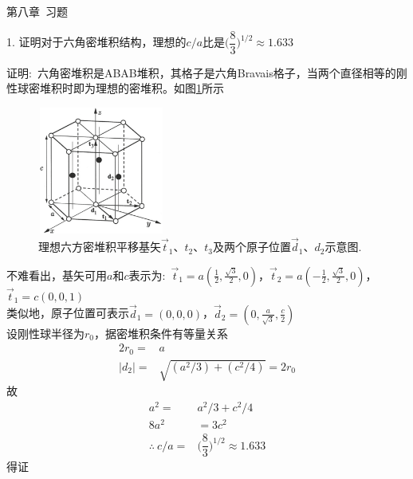 {\heiti 第八章~习题}

1. 证明对于六角密堆积结构，理想的$c/a$比是$\bigg(\dfrac83\bigg)^{1/2}\approx1.633$

证明:~六角密堆积是ABAB堆积，其格子是六角\textrm{Bravais}格子，当两个直径相等的刚性球密堆积时即为理想的密堆积。如图\ref{Fig:Hexagonal_closed-packed_structure}所示\\
\begin{figure}[h!]
\centering
\vspace*{-0.05in}
\includegraphics[height=1.65in,width=1.65in,viewport=0 0 554 569,clip]{Figures/Hexagonal_closed-packed_structure.png}
\caption{\small \textrm{理想六方密堆积平移基矢$\vec t_1$、$t_2$、$t_3$及两个原子位置$\vec d_1$、$d_2$示意图.}}%
\label{Fig:Hexagonal_closed-packed_structure}
\end{figure}
不难看出，基矢可用$a$和$c$表示为:~$\vec t_1=a(\frac12,\frac{\sqrt 3}2,0)$，$\vec t_2=a(-\frac12,\frac{\sqrt 3}2,0)$，$\vec t_1=c(0,0,1)$\\
类似地，原子位置可表示$\vec d_1=(0,0,0)$，$\vec d_2=(0,\frac{a}{\sqrt 3},\frac{c}2)$\\
设刚性球半径为$r_0$，据密堆积条件有等量关系
\begin{displaymath}
	\begin{aligned}
		2r_0=&a\\
		|d_2|=&\sqrt{(a^2/3)+(c^2/4)}=2r_0
	\end{aligned}
\end{displaymath}
故
\begin{displaymath}
	\begin{aligned}
		a^2=&a^2/3+c^2/4\\
		8a^2&=3c^2\\
		\therefore~c/a=&\bigg(\dfrac83\bigg)^{1/2}\approx1.633
	\end{aligned}
\end{displaymath}
得证

